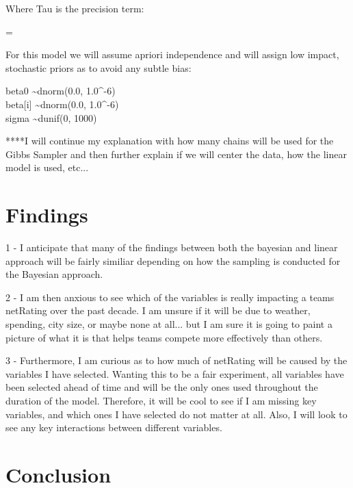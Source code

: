 \documentclass[12pt,english]{article}
\begin{document}
Where Tau is the precision term:
\begin{center}
\label{eq:4}
\tau = 

\end{center}

For this model we will assume apriori independence and will assign low impact, stochastic priors as to avoid any subtle bias:

\begin{center}
\label{eq:3}

    beta0 \sim dnorm(0.0, 1.0^{-6})\\
	beta[i] \sim dnorm(0.0, 1.0^{-6})\\
	sigma \sim dunif(0, 1000)


\end{center}


****I will continue my explanation with how many chains will be used for the Gibbs Sampler and then further explain if we will center the data, how the linear model is used, etc...


\section{Findings}\label{sec:findings}

1 - I anticipate that many of the findings between both the bayesian and linear approach will be fairly similiar depending on how the sampling is conducted for the Bayesian approach.

2 - I am then anxious to see which of the variables is really impacting a teams netRating over the past decade. I am unsure if it will be due to weather, spending, city size, or maybe none at all... but I am sure it is going to paint a picture of what it is that helps teams compete more effectively than others.

3 - Furthermore, I am curious as to how much of netRating will be caused by the variables I have selected. Wanting this to be a fair experiment, all variables have been selected ahead of time and will be the only ones used throughout the duration of the model. Therefore, it will be cool to see if I am missing key variables, and which ones I have selected do not matter at all. Also, I will look to see any key interactions between different variables. 

\section{Conclusion}\label{sec:conclusion}
\end{document}
